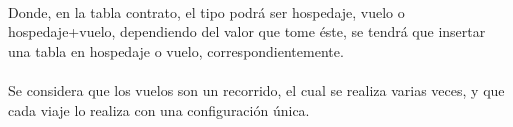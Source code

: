 \documentclass[a4paper,10pt]{article}
\begin{document}
\paragraph{}
Donde, en la tabla contrato, el tipo podrá ser hospedaje, vuelo o hospedaje+vuelo, dependiendo del valor que tome éste, se tendrá que insertar una tabla en hospedaje o vuelo, correspondientemente.

\paragraph{}
Se considera que los vuelos son un recorrido, el cual se realiza varias veces, y que cada viaje lo realiza con una configuración única.
\end{document}
